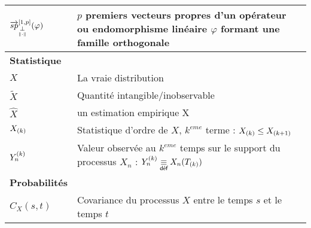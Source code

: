 \begin{tabularx}{\textwidth}{lX}
	$\overrightarrow{sp}_{\orthonormal}^{[1,p]}(\varphi)$            & $p$ premiers vecteurs propres d'un opérateur ou endomorphisme linéaire $\varphi$ formant une famille orthogonale                                                                                           \\
	\midrule
	\textbf{Statistique}                                             &                                                                                                                                                                                                            \\
	\midrule
	$X$                                                              & La \og vraie \fg distribution                                                                                                                                                                              \\
	$\widetilde{X}$                                                  & Quantité intangible/inobservable                                                                                                                                                                           \\
	$\widehat{X}$                                                    & un estimation empirique X                                                                                                                                                                                  \\
	$\ordered X k$                                                   & Statistique d'ordre de $X$, $k^{eme}$ terme : $\ordered X {k} \leq \ordered X {k+1}$                                                                                                                       \\
	$\statrang Y n {k}$                                              & Valeur observée au $k^{eme}$ temps sur le support du processus $X_n$ : $\statrang Y n k \isdef X_n( \ordered T k )$                                                                                        \\
	\midrule
	\textbf{Probabilités}                                            &                                                                                                                                                                                                            \\
	\midrule
	$C_X (s,t)$                                                      & Covariance du processus $X$ entre le temps $s$ et le temps $t$                                                                                                                                             \\

\end{tabularx}
